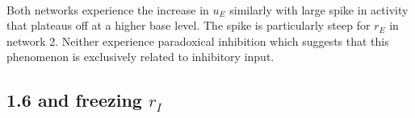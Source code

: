 \documentclass[11pt]{article}
\newcommand{\prompt}[4]{
        {\ttfamily\llap{{\color{#2}[#3]:\hspace{3pt}#4}}\vspace{-\baselineskip}}
    }
\begin{document}
            
\prompt{Out}{outcolor}{10}{}
    
    \begin{center}
    \end{center}
    { \hspace*{\fill} \\}
    

    Both networks experience the increase in \(u_E\) similarly with large
spike in activity that plateaus off at a higher base level. The spike is
particularly steep for \(r_E\) in network 2. Neither experience
paradoxical inhibition which suggests that this phenomenon is
exclusively related to inhibitory input.

    \hypertarget{and-freezing-r_i}{%
\subsection{\texorpdfstring{1.6 and freezing
\(r_I\)}{1.6 and freezing r\_I}}\label{and-freezing-r_i}}
\end{document}
